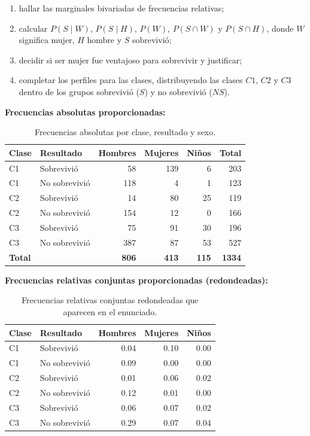 \documentclass[12pt]{article}
\begin{document}
\begin{enumerate}
    \item hallar las marginales bivariadas de frecuencias relativas;
    \item calcular $P(S\mid W)$, $P(S\mid H)$, $P(W)$, $P(S\cap W)$ y $P(S\cap H)$, donde $W$ significa mujer, $H$ hombre y $S$ sobrevivió;
    \item decidir si ser mujer fue ventajoso para sobrevivir y justificar;
    \item completar los perfiles para las clases, distribuyendo las clases $C1$, $C2$ y $C3$ dentro de los grupos sobrevivió ($S$) y no sobrevivió ($NS$).
\end{enumerate}

\textbf{Frecuencias absolutas proporcionadas:}

\begin{table}[H]
\centering
\small
\renewcommand{\arraystretch}{1.15}
\begin{tabular}{|l|l|r|r|r|r|}
\hline
\textbf{Clase} & \textbf{Resultado} & \textbf{Hombres} & \textbf{Mujeres} & \textbf{Niños} & \textbf{Total} \\ \hline
C1 & Sobrevivió & 58 & 139 & 6 & 203 \\ \hline
C1 & No sobrevivió & 118 & 4 & 1 & 123 \\ \hline
C2 & Sobrevivió & 14 & 80 & 25 & 119 \\ \hline
C2 & No sobrevivió & 154 & 12 & 0 & 166 \\ \hline
C3 & Sobrevivió & 75 & 91 & 30 & 196 \\ \hline
C3 & No sobrevivió & 387 & 87 & 53 & 527 \\ \hline
\textbf{Total} & & \textbf{806} & \textbf{413} & \textbf{115} & \textbf{1334} \\ \hline
\end{tabular}
\caption{Frecuencias absolutas por clase, resultado y sexo.}
\label{tab:titanic-absolutas}
\end{table}

\textbf{Frecuencias relativas conjuntas proporcionadas (redondeadas):}

\begin{table}[H]
\centering
\small
\renewcommand{\arraystretch}{1.15}
\begin{tabular}{|l|l|r|r|r|}
\hline
\textbf{Clase} & \textbf{Resultado} & \textbf{Hombres} & \textbf{Mujeres} & \textbf{Niños} \\ \hline
C1 & Sobrevivió & 0.04 & 0.10 & 0.00 \\ \hline
C1 & No sobrevivió & 0.09 & 0.00 & 0.00 \\ \hline
C2 & Sobrevivió & 0.01 & 0.06 & 0.02 \\ \hline
C2 & No sobrevivió & 0.12 & 0.01 & 0.00 \\ \hline
C3 & Sobrevivió & 0.06 & 0.07 & 0.02 \\ \hline
C3 & No sobrevivió & 0.29 & 0.07 & 0.04 \\ \hline
\end{tabular}
\caption{Frecuencias relativas conjuntas redondeadas que aparecen en el enunciado.}
\label{tab:titanic-relativas-originales}
\end{table}
\end{document}
